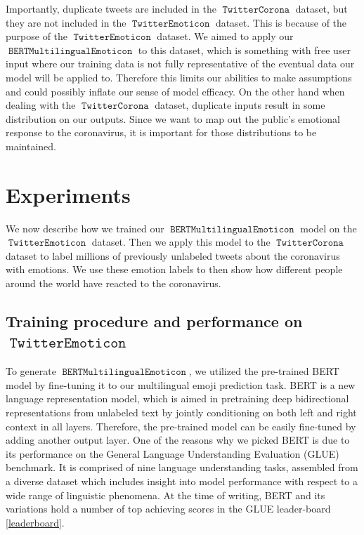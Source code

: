 \documentclass[11pt]{article}
\DeclareMathOperator{\model}{\texttt{BERTMultilingualEmoticon}}
\DeclareMathOperator{\emoticon}{\texttt{TwitterEmoticon}}
\DeclareMathOperator{\corona}{\texttt{TwitterCorona}}
\begin{document}
Importantly, duplicate tweets are included in the $\corona$ dataset,
but they are not included in the $\emoticon$ dataset.
This is because of the purpose of the $\emoticon$ dataset. 
We aimed to apply our $\model$ to this dataset,
which is something with free user input where our training data is not fully representative of the eventual data our model will be applied to.
Therefore this limits our abilities to make assumptions and could possibly inflate our sense of model efficacy.
On the other hand when dealing with the $\corona$ dataset,
duplicate inputs result in some distribution on our outputs.
Since we want to map out the public's emotional response to the coronavirus, it is important 
for those distributions to be maintained.

\section{Experiments}
\label{sec:experiments}

We now describe how we trained our $\model$ model on the $\emoticon$ dataset.
Then we apply this model to the $\corona$ dataset to label millions of previously unlabeled tweets about the coronavirus with emotions.
We use these emotion labels to then show how different people around the world have reacted to the coronavirus.

\subsection{Training procedure and performance on $\emoticon$}
To generate $\model$, we utilized the pre-trained BERT model \cite{bert} by fine-tuning it to our multilingual emoji prediction task. 
BERT is a new language representation model, which is aimed in pretraining deep bidirectional representations from unlabeled text by jointly conditioning on both left and right context in all layers.
Therefore, the pre-trained model can be easily fine-tuned by adding another output layer.
One of the reasons why we picked BERT is due to its performance on the General Language Understanding Evaluation (GLUE) \cite{} benchmark.
It is comprised of nine language understanding tasks, assembled from a diverse dataset which includes insight into model performance with respect to a wide range of linguistic phenomena.
At the time of writing, BERT and its variations hold a number of top achieving scores in the GLUE leader-board \ref{leaderboard}.   
\end{document}
